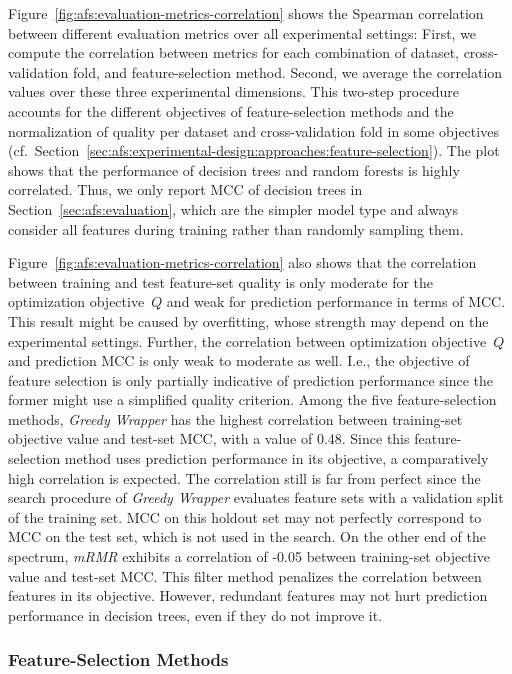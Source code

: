 \documentclass{article}
\theoremstyle{definition}
\begin{document}
Figure~\ref{fig:afs:evaluation-metrics-correlation} shows the Spearman correlation between different evaluation metrics over all experimental settings:
First, we compute the correlation between metrics for each combination of dataset, cross-validation fold, and feature-selection method.
Second, we average the correlation values over these three experimental dimensions.
This two-step procedure accounts for the different objectives of feature-selection methods and the normalization of quality per dataset and cross-validation fold in some objectives (cf.~Section~\ref{sec:afs:experimental-design:approaches:feature-selection}).
The plot shows that the performance of decision trees and random forests is highly correlated.
Thus, we only report MCC of decision trees in Section~\ref{sec:afs:evaluation}, which are the simpler model type and always consider all features during training rather than randomly sampling them.

Figure~\ref{fig:afs:evaluation-metrics-correlation} also shows that the correlation between training and test feature-set quality is only moderate for the optimization objective~$Q$ and weak for prediction performance in terms of MCC.
This result might be caused by overfitting, whose strength may depend on the experimental settings.
Further, the correlation between optimization objective~$Q$ and prediction MCC is only weak to moderate as well.
I.e., the objective of feature selection is only partially indicative of prediction performance since the former might use a simplified quality criterion.
Among the five feature-selection methods, \emph{Greedy Wrapper} has the highest correlation between training-set objective value and test-set MCC, with a value of 0.48.
Since this feature-selection method uses prediction performance in its objective, a comparatively high correlation is expected.
The correlation still is far from perfect since the search procedure of \emph{Greedy Wrapper} evaluates feature sets with a validation split of the training set.
MCC on this holdout set may not perfectly correspond to MCC on the test set, which is not used in the search.
On the other end of the spectrum, \emph{mRMR} exhibits a correlation of -0.05 between training-set objective value and test-set MCC.
This filter method penalizes the correlation between features in its objective.
However, redundant features may not hurt prediction performance in decision trees, even if they do not improve it.

\subsubsection{Feature-Selection Methods}
\label{sec:afs:appendix:evaluation:feature-selection}
\end{document}
